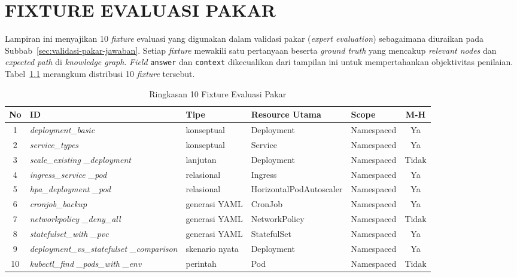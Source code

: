 \cleardoublepage
\chapter{FIXTURE EVALUASI PAKAR}

Lampiran ini menyajikan 10 \textit{fixture} evaluasi yang digunakan dalam validasi pakar (\textit{expert evaluation}) sebagaimana diuraikan pada Subbab~\ref{sec:validasi-pakar-jawaban}. Setiap \textit{fixture} mewakili satu pertanyaan beserta \textit{ground truth} yang mencakup \textit{relevant nodes} dan \textit{expected path} di \textit{knowledge graph}. \textit{Field} \texttt{answer} dan \texttt{context} dikecualikan dari tampilan ini untuk mempertahankan objektivitas penilaian. Tabel~\ref{tbl:fixture-summary} merangkum distribusi 10 \textit{fixture} tersebut.

\begin{table}[h]
\centering
\caption{Ringkasan 10 Fixture Evaluasi Pakar}
\label{tbl:fixture-summary}
{\small
\setlength{\tabcolsep}{4pt}
\begin{tabular}{|c|p{3.3cm}|p{2cm}|p{2.6cm}|p{2.3cm}|c|}
\hline
\textbf{No} & \textbf{ID} & \textbf{Tipe} & \textbf{Resource Utama} & \textbf{Scope} & \textbf{M-H} \\
\hline
1 & \textit{deployment\_basic}            & konseptual    & Deployment              & Namespaced & Ya \\
2 & \textit{service\_types}               & konseptual    & Service                 & Namespaced & Ya \\
3 & \textit{scale\_existing \_deployment}  & lanjutan      & Deployment              & Namespaced & Tidak \\
4 & \textit{ingress\_service \_pod}        & relasional    & Ingress                 & Namespaced & Ya \\
5 & \textit{hpa\_deployment \_pod}         & relasional    & Horizontal\allowbreak{}Pod\allowbreak{}Autoscaler & Namespaced & Ya \\
6 & \textit{cronjob\_backup}              & generasi YAML & CronJob                 & Namespaced & Ya \\
7 & \textit{networkpolicy \_deny\_all}     & generasi YAML & NetworkPolicy           & Namespaced & Tidak \\
8 & \textit{statefulset\_with \_pvc}       & generasi YAML & StatefulSet             & Namespaced & Ya \\
9 & \textit{deployment\_vs\_\allowbreak{}statefulset \_comparison} & skenario nyata & Deployment      & Namespaced    & Ya \\
10 & \textit{kubectl\_find \_pods\_with \_env} & perintah     & Pod                    & Namespaced & Tidak \\
\hline
\end{tabular}
}
\end{table}

